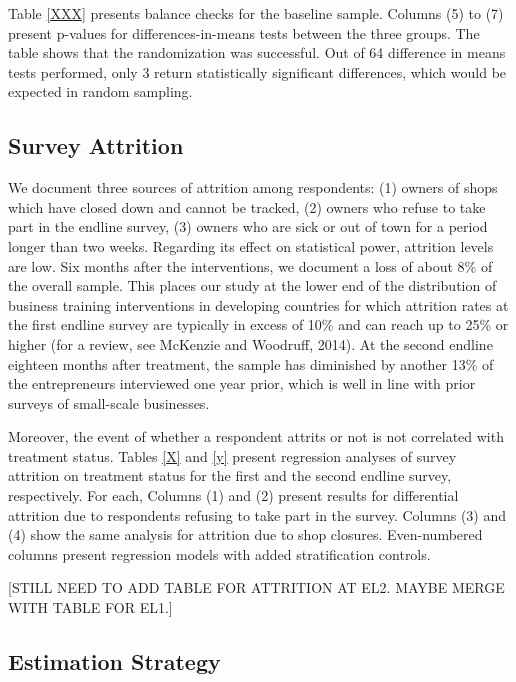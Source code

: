 \documentclass[11.5pt]{article}
\begin{document}
Table \ref{XXX} presents balance checks for the baseline sample. Columns (5) to (7) present p-values for differences-in-means tests between the three groups. The table shows that the randomization was successful. Out of 64 difference in means tests performed, only 3 return statistically significant differences, which would be expected in random sampling.

\subsection{Survey Attrition}

We document three sources of attrition among respondents: (1) owners of shops which have closed down and cannot be tracked, (2) owners who refuse to take part in the endline survey, (3) owners who are sick or out of town for a period longer than two weeks. Regarding its effect on statistical power, attrition levels are low. Six months after the interventions, we document a loss of about 8\% of the overall sample. This places our study at the lower end of the distribution of business training interventions in developing countries for which attrition rates at the first endline survey are typically in excess of 10\% and can reach up to 25\% or higher (for a review, see McKenzie and Woodruff, 2014). At the second endline eighteen months after treatment, the sample has diminished by another 13\% of the entrepreneurs interviewed one year prior, which is well in line with prior surveys of small-scale businesses. %

Moreover, the event of whether a respondent attrits or not is not correlated with treatment status. Tables \ref{X} and \ref{y} present regression analyses of survey attrition on treatment status for the first and the second endline survey, respectively. For each, Columns (1) and (2) present results for differential attrition due to respondents refusing to take part in the survey. Columns (3) and (4) show the same analysis for attrition due to shop closures. Even-numbered columns present regression models with added stratification controls. 

[\textcolor[rgb]{0.00,0.00,0.00}{STILL NEED TO ADD TABLE FOR ATTRITION AT EL2. MAYBE MERGE WITH TABLE FOR EL1.}]

\subsection{Estimation Strategy}
\end{document}
